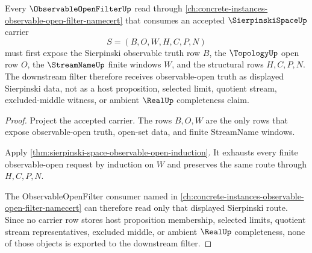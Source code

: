 \begin{theorem}
\label{thm:sierpinski-space-observable-open-filter-link}
Every $\ObservableOpenFilterUp$ read through \autoref{ch:concrete-instances-observable-open-filter-namecert} that consumes an accepted $\SierpinskiSpaceUp$ carrier
$$
S=(B,O,W,H,C,P,N)
$$
must first expose the Sierpinski observable truth row $B$, the $\TopologyUp$ open row $O$, the $\StreamNameUp$ finite windows $W$, and the structural rows $H,C,P,N$. The downstream filter therefore receives observable-open truth as displayed Sierpinski data, not as a host proposition, selected limit, quotient stream, excluded-middle witness, or ambient $\RealUp$ completeness claim.
\end{theorem}
\begin{proof}
Project the accepted carrier. The rows $B,O,W$ are the only rows that expose observable-open truth, open-set data, and finite StreamName windows.

Apply \autoref{thm:sierpinski-space-observable-open-induction}. It exhausts every finite observable-open request by induction on $W$ and preserves the same route through $H,C,P,N$.

The ObservableOpenFilter consumer named in \autoref{ch:concrete-instances-observable-open-filter-namecert} can therefore read only that displayed Sierpinski route. Since no carrier row stores host proposition membership, selected limits, quotient stream representatives, excluded middle, or ambient $\RealUp$ completeness, none of those objects is exported to the downstream filter.
\end{proof}


\begin{closurestatus}{\SierpinskiSpaceUp}
  \theoryclosure{\seedClosure}
  \formalstatus{\unformalizedV}
\end{closurestatus}
